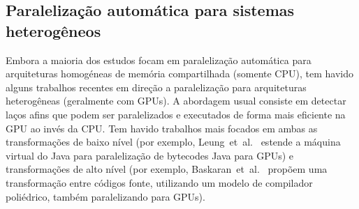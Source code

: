 \documentclass[a4paper,12pt]{article}
\newcommand{\etal}{et~al.}
\begin{document}

\subsection{Paralelização automática para sistemas heterogêneos}

Embora a maioria dos estudos focam em paralelização automática para arquiteturas homogéneas de memória compartilhada (somente CPU), tem havido alguns trabalhos recentes em direção a paralelização para arquiteturas heterogêneas (geralmente com GPUs). A abordagem usual consiste em detectar laços afins que podem ser paralelizados e executados de forma mais eficiente na GPU ao invés da CPU. Tem havido trabalhos mais focados em ambas as transformações de baixo nível (por exemplo, Leung~\etal~\cite{leung09} estende a máquina virtual do Java para paralelização de bytecodes Java para GPUs) e transformações de alto nível (por exemplo, Baskaran~\etal~\cite{baskaran08,baskaran10} propõem uma transformação entre códigos fonte, utilizando um modelo de compilador poliédrico, também paralelizando para GPUs).

\end{document}
